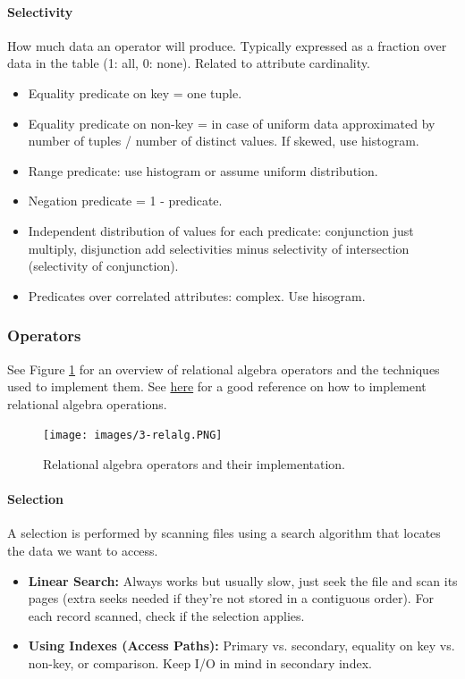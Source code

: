 \paragraph{Selectivity}
How much data an operator will produce. Typically expressed as a fraction over data in the table (1: all, 0: none). Related to attribute cardinality.
\begin{itemize}
    \item Equality predicate on key = one tuple.
    \item Equality predicate on non-key = in case of uniform data approximated by number of tuples / number of distinct values. If skewed, use histogram.
    \item Range predicate: use histogram or assume uniform distribution.
    \item Negation predicate = 1 - predicate.
    \item Independent distribution of values for each predicate: conjunction just multiply, disjunction add selectivities minus selectivity of intersection (selectivity of conjunction).
    \item Predicates over correlated attributes: complex. Use hisogram.
\end{itemize}



\subsubsection{Operators}

See Figure \ref{fig:relalg} for an overview of relational algebra operators and the techniques used to implement them. See \href{https://www.javatpoint.com/selection-operation-in-query-processing}{here} for a good reference on how to implement relational algebra operations.

\begin{figure}[h]
	\centering
	\texttt{[image: images/3-relalg.PNG]}
	\caption{Relational algebra operators and their implementation.}
	\label{fig:relalg}
\end{figure}

\paragraph{Selection}
A selection is performed by scanning files using a search algorithm that locates the data we want to access.
\begin{itemize}
    \item \textbf{Linear Search:} Always works but usually slow, just seek the file and scan its pages (extra seeks needed if they're not stored in a contiguous order). For each record scanned, check if the selection applies.
    \item \textbf{Using Indexes (Access Paths):} Primary vs. secondary, equality on key vs. non-key, or comparison. Keep I/O in mind in secondary index.
\end{itemize}

